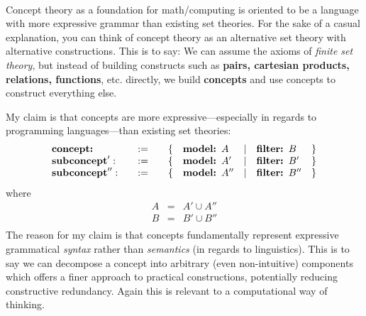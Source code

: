 \documentclass[twoside]{article}
\begin{document}
\ \\[0.5cm]

Concept theory as a foundation for math/computing is oriented to be a language with more expressive grammar than existing set theories.
For the sake of a casual explanation, you can think of concept theory as an alternative set theory with alternative constructions.
This is to say: We can assume the axioms of \emph{finite set theory}, but instead of building constructs such as
{\bfseries pairs, cartesian products, relations, functions}, etc. directly, we build {\bfseries concepts} and use concepts
to construct everything else.

My claim is that concepts are more expressive---especially in regards to programming languages---than existing set theories:
$$ \begin{array}{lcllcll}
\mbox{\bfseries concept:} \quad & := \quad & \{ &  \mbox{\bfseries model: } A & | & \mbox{\bfseries filter: } B & \}		\\
\mbox{\bfseries subconcept}': \quad & := \quad & \{ & \mbox{\bfseries model: } A' & | & \mbox{\bfseries filter: } B' & \}	\\
\mbox{\bfseries subconcept}'': \quad & := \quad & \{ & \mbox{\bfseries model: } A'' & | & \mbox{\bfseries filter: } B'' & \}	\\
\end{array} $$
where
$$ \begin{array}{rcl}
A & = & A'\cup A''		\\
B & = & B'\cup B''		\\
\end{array} $$
The reason for my claim is that concepts fundamentally represent expressive grammatical \emph{syntax} rather than
\emph{semantics} (in regards to linguistics). This is to say we can decompose a concept into arbitrary (even non-intuitive)
components which offers a finer approach to practical constructions, potentially reducing constructive redundancy.
Again this is relevant to a computational way of thinking.

\newpage
\end{document}

